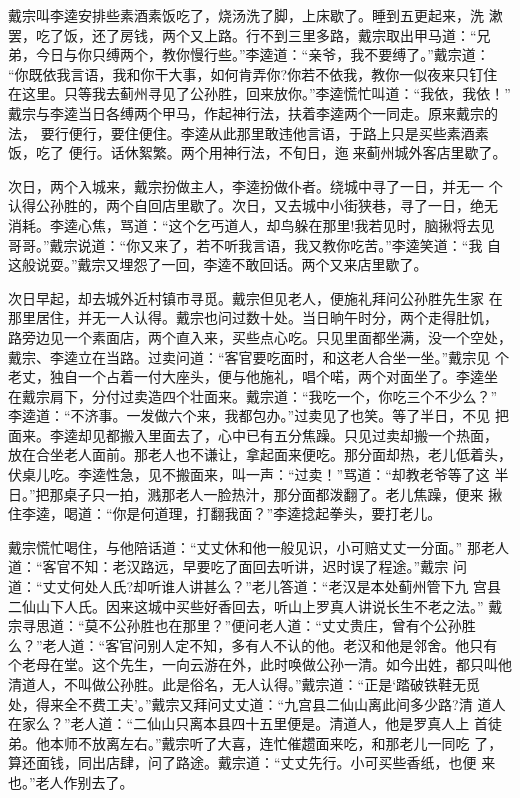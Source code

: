 戴宗叫李逵安排些素酒素饭吃了，烧汤洗了脚，上床歇了。睡到五更起来，洗
漱罢，吃了饭，还了房钱，两个又上路。行不到三里多路，戴宗取出甲马道：“兄
弟，今日与你只缚两个，教你慢行些。”李逵道：“亲爷，我不要缚了。”戴宗道：
“你既依我言语，我和你干大事，如何肯弄你?你若不依我，教你一似夜来只钉住
在这里。只等我去蓟州寻见了公孙胜，回来放你。”李逵慌忙叫道：“我依，我依！”
戴宗与李逵当日各缚两个甲马，作起神行法，扶着李逵两个一同走。原来戴宗的法，
要行便行，要住便住。李逵从此那里敢违他言语，于路上只是买些素酒素饭，吃了
便行。话休絮繁。两个用神行法，不旬日，迤来蓟州城外客店里歇了。

次日，两个入城来，戴宗扮做主人，李逵扮做仆者。绕城中寻了一日，并无一
个认得公孙胜的，两个自回店里歇了。次日，又去城中小街狭巷，寻了一日，绝无
消耗。李逵心焦，骂道：“这个乞丐道人，却鸟躲在那里!我若见时，脑揪将去见
哥哥。”戴宗说道：“你又来了，若不听我言语，我又教你吃苦。”李逵笑道：“我
自这般说耍。”戴宗又埋怨了一回，李逵不敢回话。两个又来店里歇了。

次日早起，却去城外近村镇市寻觅。戴宗但见老人，便施礼拜问公孙胜先生家
在那里居住，并无一人认得。戴宗也问过数十处。当日晌午时分，两个走得肚饥，
路旁边见一个素面店，两个直入来，买些点心吃。只见里面都坐满，没一个空处，
戴宗、李逵立在当路。过卖问道：“客官要吃面时，和这老人合坐一坐。”戴宗见
个老丈，独自一个占着一付大座头，便与他施礼，唱个喏，两个对面坐了。李逵坐
在戴宗肩下，分付过卖造四个壮面来。戴宗道：“我吃一个，你吃三个不少么？”
李逵道：“不济事。一发做六个来，我都包办。”过卖见了也笑。等了半日，不见
把面来。李逵却见都搬入里面去了，心中已有五分焦躁。只见过卖却搬一个热面，
放在合坐老人面前。那老人也不谦让，拿起面来便吃。那分面却热，老儿低着头，
伏桌儿吃。李逵性急，见不搬面来，叫一声：“过卖！”骂道：“却教老爷等了这
半日。”把那桌子只一拍，溅那老人一脸热汁，那分面都泼翻了。老儿焦躁，便来
揪住李逵，喝道：“你是何道理，打翻我面？”李逵捻起拳头，要打老儿。

戴宗慌忙喝住，与他陪话道：“丈丈休和他一般见识，小可赔丈丈一分面。”
那老人道：“客官不知：老汉路远，早要吃了面回去听讲，迟时误了程途。”戴宗
问道：“丈丈何处人氏?却听谁人讲甚么？”老儿答道：“老汉是本处蓟州管下九
宫县二仙山下人氏。因来这城中买些好香回去，听山上罗真人讲说长生不老之法。”
戴宗寻思道：“莫不公孙胜也在那里？”便问老人道：“丈丈贵庄，曾有个公孙胜
么？”老人道：“客官问别人定不知，多有人不认的他。老汉和他是邻舍。他只有
个老母在堂。这个先生，一向云游在外，此时唤做公孙一清。如今出姓，都只叫他
清道人，不叫做公孙胜。此是俗名，无人认得。”戴宗道：“正是‘踏破铁鞋无觅
处，得来全不费工夫’。”戴宗又拜问丈丈道：“九宫县二仙山离此间多少路?清
道人在家么？”老人道：“二仙山只离本县四十五里便是。清道人，他是罗真人上
首徒弟。他本师不放离左右。”戴宗听了大喜，连忙催趱面来吃，和那老儿一同吃
了，算还面钱，同出店肆，问了路途。戴宗道：“丈丈先行。小可买些香纸，也便
来也。”老人作别去了。

